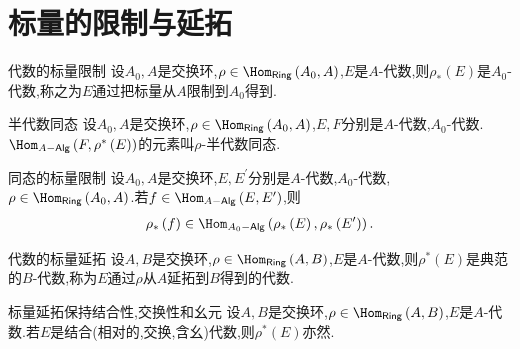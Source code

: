 \section{标量的限制与延拓}

\begin{definition}{代数的标量限制}{}
	设$A_{0},A$是交换环,$\rho\in\Hom_{\mathsf{Ring}}\left(A_{0},A\right)$,$E$是$A$-代数,则$\rho_{\ast}\left(E\right)$是$A_{0}$-代数,称之为$E$通过把标量从$A$限制到$A_{0}$得到.
\end{definition}

\begin{definition}{半代数同态}{}
	设$A_{0},A$是交换环,$\rho\in\Hom_{\mathsf{Ring}}\left(A_{0},A\right)$,$E,F$分别是$A$-代数,$A_{0}$-代数.$\Hom_{A-\mathsf{Alg}}\left(F,\rho^{\ast}\left(E\right)\right)$的元素叫$\rho$-半代数同态.
\end{definition}

\begin{proposition}{同态的标量限制}{}
	设$A_{0},A$是交换环,$E,E^{\prime}$分别是$A$-代数,$A_{0}$-代数,$\rho\in\Hom_{\mathsf{Ring}}\left(A_{0},A\right)$.若$f\in\Hom_{A-\mathsf{Alg}}\left(E,E^{\prime}\right)$,则
	\begin{align*}
		\rho_{\ast}\left(f\right)\in\Hom_{A_{0}-\mathsf{Alg}}\left(\rho_{\ast}\left(E\right),\rho_{\ast}\left(E^{\prime}\right)\right).
	\end{align*}
\end{proposition}

\begin{definition}{代数的标量延拓}{}
	设$A,B$是交换环,$\rho\in\Hom_{\mathsf{Ring}}\left(A,B\right)$,$E$是$A$-代数,则$\rho^{\ast}\left(E\right)$是典范的$B$-代数,称为$E$通过$\rho$从$A$延拓到$B$得到的代数.
\end{definition}

\begin{proposition}{标量延拓保持结合性,交换性和幺元}{}
	设$A,B$是交换环,$\rho\in\Hom_{\mathsf{Ring}}\left(A,B\right)$,$E$是$A$-代数.若$E$是结合(相对的,交换,含幺)代数,则$\rho^{\ast}\left(E\right)$亦然.
\end{proposition}


